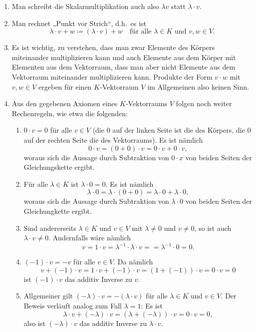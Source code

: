 \begin{bem}
 \begin{enumerate}[leftmargin=*]
  \item
   Man schreibt die Skalarmultiplikation auch also $\lambda v$ statt $\lambda \cdot v$.
  \item
   Man rechnet „Punkt vor Strich“, d.h.\ es ist
   \[
    \lambda \cdot v + w \coloneqq (\lambda \cdot v) + w
    \quad\text{für alle $\lambda \in K$ und $v,w \in V$}.
   \]
  \item
   Es ist wichtig, zu verstehen, dass man zwar Elemente des Körpers miteinander multiplizieren kann und auch Elemente aus dem Körper mit Elementen aus dem Vektorraum, dass man aber nicht Elemente aus dem Vektorraum miteinander multiplizieren kann. Produkte der Form $v \cdot w$ mit $v,w \in V$ ergeben für einen $K$-Vektorraum $V$ im Allgemeinen also keinen Sinn.
  \item
   Aus den gegebenen Axiomen eines $K$-Vektorraums $V$ folgen noch weiter Rechenregeln, wie etwa die folgenden:
   \begin{enumerate}[label=\alph*)]
    \item
     $0 \cdot v = 0$ für alle $v \in V$ (die $0$ auf der linken Seite ist die des Körpers, die $0$ auf der rechten Seite die des Vektorraums). Es ist nämlich
     \[
      0 \cdot v = (0+0) \cdot v = 0 \cdot v + 0 \cdot v,
     \]
     woraus sich die Aussage durch Subtraktion von $0 \cdot x$ von beiden Seiten der Gleichungskette ergibt.
    \item
     Für alle $\lambda \in K$ ist $\lambda \cdot 0 = 0$. Es ist nämlich
     \[
      \lambda \cdot 0
      = \lambda \cdot (0+0)
      = \lambda \cdot 0 + \lambda \cdot 0,
     \]
     woraus sich die Aussage durch Subtraktion von $\lambda \cdot 0$ von beiden Seiten der Gleichungkette ergibt.
    \item
     Sind andererseits $\lambda \in K$ und $v \in V$ mit $\lambda \neq 0$ und $v \neq 0$, so ist auch $\lambda \cdot v \neq 0$. Andernfalls wäre nämlich
     \[
      v
      = 1 \cdot v
      = \lambda^{-1} \cdot \lambda \cdot v = 
      = \lambda^{-1} \cdot 0
      = 0.
     \]
    \item
     $(-1) \cdot v = -v$ für alle $v \in V$. Da nämlich
     \[
      v + (-1) \cdot v = 1 \cdot v + (-1) \cdot v = (1 + (-1)) \cdot v = 0 \cdot v = 0
     \]
     ist $(-1) \cdot v$ das additiv Inverse zu $v$.
    \item
     Allgemeiner gilt $(-\lambda) \cdot v = -(\lambda \cdot v)$ für alle $\lambda \in K$ und $v \in V$. Der Beweis verläuft analog zum Fall $\lambda = 1$: Es ist
     \[
      \lambda \cdot v + (-\lambda) \cdot v
      = (\lambda + (-\lambda)) \cdot v
      = 0 \cdot v
      = 0,
     \]
     also ist $(-\lambda) \cdot v$ das additiv Inverse zu $\lambda \cdot v$.
   \end{enumerate}
 \end{enumerate}
\end{bem}


